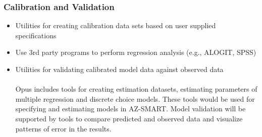 \documentclass[titlepage]{article}
\begin{document}
\subsubsection{Calibration and Validation}
\begin{itemize}
	\item Utilities for creating calibration data sets based on user supplied specifications
	\item Use 3rd party programs to perform regression analysis (e.g., ALOGIT, SPSS)
	\item Utilities for validating calibrated model data against observed data
	\\\\
	Opus includes tools for creating estimation datasets, estimating parameters of multiple regression and discrete choice models.  These tools would be used for specifying and estimating models in AZ-SMART.  Model validation will be supported by tools to compare predicted and observed data and visualize patterns of error in the results.
\end{itemize}
\end{document}
